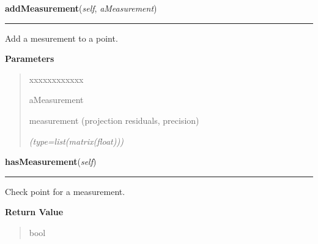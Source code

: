     \label{gblfit:GblPoint:addMeasurement}

    \vspace{0.5ex}

\hspace{.8\funcindent}\begin{boxedminipage}{\funcwidth}

    \raggedright \textbf{addMeasurement}(\textit{self}, \textit{aMeasurement})

    \vspace{-1.5ex}

    \rule{\textwidth}{0.5\fboxrule}
\setlength{\parskip}{2ex}
    Add a mesurement to a point.

\setlength{\parskip}{1ex}
      \textbf{Parameters}
      \vspace{-1ex}

      \begin{quote}
        \begin{Ventry}{xxxxxxxxxxxx}

          \item[aMeasurement]

          measurement (projection residuals, precision)

            {\it (type=list(matrix(float)))}

        \end{Ventry}

      \end{quote}

    \end{boxedminipage}

    \label{gblfit:GblPoint:hasMeasurement}

    \vspace{0.5ex}

\hspace{.8\funcindent}\begin{boxedminipage}{\funcwidth}

    \raggedright \textbf{hasMeasurement}(\textit{self})

    \vspace{-1.5ex}

    \rule{\textwidth}{0.5\fboxrule}
\setlength{\parskip}{2ex}
    Check point for a measurement.

\setlength{\parskip}{1ex}
      \textbf{Return Value}
    \vspace{-1ex}

      \begin{quote}
      bool

      \end{quote}

    \end{boxedminipage}

